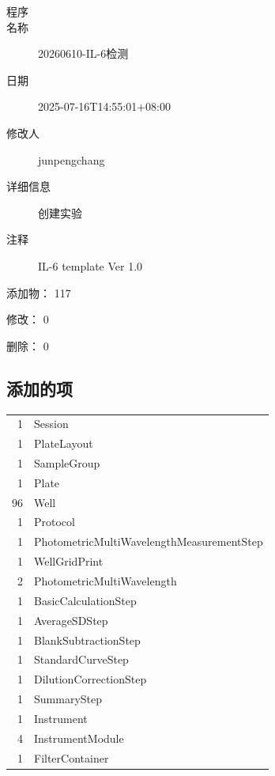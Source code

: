 \documentclass[UTF8,10pt,a4paper,fontset=fandol]{ctexart}
\newcommand{\fieldvalue}[1]{#1}
\begin{document}
\begin{description}
\item[程序]
\item[名称]%
\fieldvalue{20260610-IL-6检测}

\item[日期]%
\fieldvalue{2025-07-16T14:55:01+08:00}

\item[修改人]%
\fieldvalue{junpengchang}

\item[详细信息]%
\fieldvalue{创建实验}

\item[注释]%
\fieldvalue{IL-6 template Ver 1.0}
\end{description}

\noindent
添加物：%
\fieldvalue{117}

\par\noindent
修改：%
\fieldvalue{0}

\par\noindent
删除：%
\fieldvalue{0}

\subsection*{添加的项}

\begin{tabular}{r l}
1 & Session\\
1 & PlateLayout\\
1 & SampleGroup\\
1 & Plate\\
96 & Well\\
1 & Protocol\\
1 & PhotometricMultiWavelengthMeasurementStep\\
1 & WellGridPrint\\
2 & PhotometricMultiWavelength\\
1 & BasicCalculationStep\\
1 & AverageSDStep\\
1 & BlankSubtractionStep\\
1 & StandardCurveStep\\
1 & DilutionCorrectionStep\\
1 & SummaryStep\\
1 & Instrument\\
4 & InstrumentModule\\
1 & FilterContainer
\end{tabular}
\end{document}
